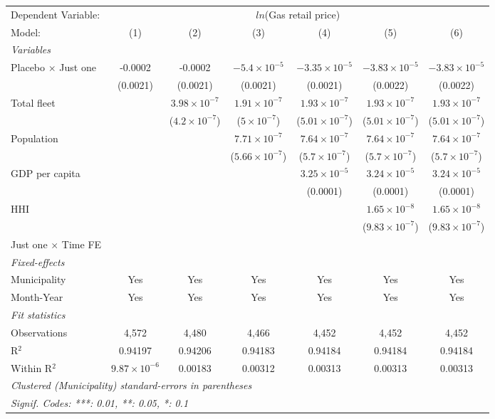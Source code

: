 \documentclass[
]{article}
\begin{document}
\begin{tabular}{lcccccc}
\tabularnewline\midrule\midrule
Dependent Variable:&\multicolumn{6}{c}{$ln$(Gas retail price)}\\
Model:&(1) & (2) & (3) & (4) & (5) & (6)\\
\midrule \emph{Variables}&   &   &   &   &   &  \\
Placebo $\times $ Just one & -0.0002 & -0.0002 & $-5.4\times 10^{-5}$ & $-3.35\times 10^{-5}$ & $-3.83\times 10^{-5}$ & $-3.83\times 10^{-5}$\\
  &(0.0021) & (0.0021) & (0.0021) & (0.0021) & (0.0022) & (0.0022)\\
Total fleet &    & $3.98\times 10^{-7}$ & $1.91\times 10^{-7}$ & $1.93\times 10^{-7}$ & $1.93\times 10^{-7}$ & $1.93\times 10^{-7}$\\
  &   & ($4.2\times 10^{-7}$) & ($5\times 10^{-7}$) & ($5.01\times 10^{-7}$) & ($5.01\times 10^{-7}$) & ($5.01\times 10^{-7}$)\\
Population &    &    & $7.71\times 10^{-7}$ & $7.64\times 10^{-7}$ & $7.64\times 10^{-7}$ & $7.64\times 10^{-7}$\\
  &   &    & ($5.66\times 10^{-7}$) & ($5.7\times 10^{-7}$) & ($5.7\times 10^{-7}$) & ($5.7\times 10^{-7}$)\\
GDP per capita &    &    &    & $3.25\times 10^{-5}$ & $3.24\times 10^{-5}$ & $3.24\times 10^{-5}$\\
  &   &    &    & (0.0001) & (0.0001) & (0.0001)\\
HHI &    &    &    &    & $1.65\times 10^{-8}$ & $1.65\times 10^{-8}$\\
  &   &    &    &    & ($9.83\times 10^{-7}$) & ($9.83\times 10^{-7}$)\\
Just one $\times$ Time FE &  &  &  &  &  & \\
\midrule \emph{Fixed-effects}&   &   &   &   &   &  \\
Municipality & Yes & Yes & Yes & Yes & Yes & Yes\\
Month-Year & Yes & Yes & Yes & Yes & Yes & Yes\\
\midrule \emph{Fit statistics}&  & & & & & \\
Observations & 4,572&4,480&4,466&4,452&4,452&4,452\\
R$^2$ & 0.94197&0.94206&0.94183&0.94184&0.94184&0.94184\\
Within R$^2$ & $9.87\times 10^{-6}$&0.00183&0.00312&0.00313&0.00313&0.00313\\
\midrule\midrule\multicolumn{7}{l}{\emph{Clustered (Municipality) standard-errors in parentheses}}\\
\multicolumn{7}{l}{\emph{Signif. Codes: ***: 0.01, **: 0.05, *: 0.1}}\\
\end{tabular}
\end{document}
